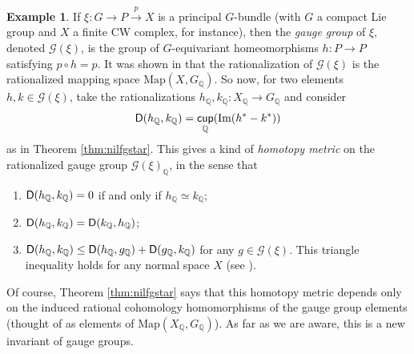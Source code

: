 \documentclass[amscd,amssymb,verbatim,10pt]{amsart}
\numberwithin{equation}{section}
\theoremstyle{plain}
\theoremstyle{definition}
\newtheorem{ex}[theorem]{Example}
\DeclareMathOperator{\cu}{{\mathsf{cup}}}
\def\Im{\protect\operatorname{Im}}
\def\Q{{\mathbb Q}}
\newcommand{\D}{{\sf {D}}}
\begin{document}
\begin{ex}\label{exam:gauge}
If $\xi\colon G \to P \stackrel{p}{\to} X$ is a principal $G$-bundle (with $G$ a compact Lie group
and $X$ a finite CW complex, for instance), then the \emph{gauge group} of $\xi$, 
denoted $\mathcal G(\xi)$, is the 
group of $G$-equivariant homeomorphisms $h \colon P \to P$ satisfying $p\circ h = p$. It was 
shown in \cite{FO} that the rationalization of $\mathcal G(\xi)$ is the rationalized
mapping space $\text{Map}(X,G_\Q)$. So now, for two elements $h,k \in \mathcal G(\xi)$, 
take the rationalizations $h_\Q,k_\Q\colon X_\Q \to G_\Q$ and consider 
$$\D(h_\Q,k_\Q) = \cu_\Q(\Im(h^*-k^*))$$
as in Theorem \ref{thm:nilfgstar}. This gives a kind of \emph{homotopy metric} on the rationalized
gauge group $\mathcal G(\xi)_\Q$, in the sense that 
\begin{enumerate}
\item $\D(h_\Q,k_\Q)=0$ if and only if $h_\Q \simeq k_\Q$;
\item $\D(h_\Q,k_\Q) = \D(k_\Q,h_\Q)$;
\item $\D(h_\Q,k_\Q) \leq \D(h_\Q,g_\Q) + \D(g_\Q,k_\Q)$ for any $g \in \mathcal G(\xi)$.
This triangle inequality holds for any normal space $X$ (see \cite{MM,CD}). 
\end{enumerate}
Of course, Theorem \ref{thm:nilfgstar} says that this homotopy metric depends only
on the induced rational cohomology homomorphisms of the gauge group elements (thought
of as elements of $\text{Map}(X_\Q,G_\Q)$). As far as we are aware, this is a new 
invariant of gauge groups.
\end{ex}

\appendix
\end{document}
